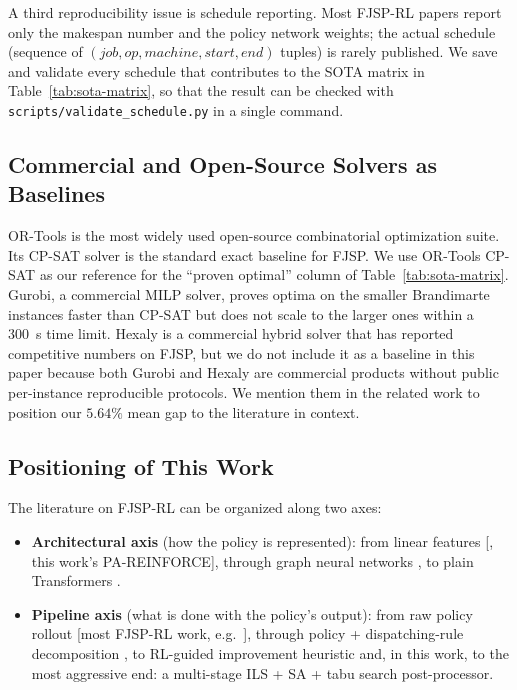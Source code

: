 \documentclass[10pt]{article}
\theoremstyle{definition}
\newcommand{\eg}{e.g.\!}
\begin{document}
A third reproducibility issue is schedule reporting. Most FJSP-RL
papers report only the makespan number and the policy network
weights; the actual schedule (sequence of
$(job, op, machine, start, end)$ tuples) is rarely published. We
save and validate every schedule that contributes to the SOTA
matrix in Table~\ref{tab:sota-matrix}, so that the result can be
checked with \texttt{scripts/validate\_schedule.py} in a single
command.

\subsection{Commercial and Open-Source Solvers as Baselines}
\label{sec:rw-solvers}

OR-Tools \citep{Perron2022ORtools} is the most widely used
open-source combinatorial optimization suite. Its CP-SAT
solver is the standard exact baseline for FJSP. We use
OR-Tools CP-SAT as our reference for the ``proven optimal''
column of Table~\ref{tab:sota-matrix}. Gurobi, a
commercial MILP solver, proves optima on the smaller
Brandimarte instances faster than CP-SAT but does not
scale to the larger ones within a 300~s time limit.
Hexaly is a commercial hybrid solver that has
reported competitive numbers on FJSP, but we do not
include it as a baseline in this paper because both
Gurobi and Hexaly are commercial products without
public per-instance reproducible protocols. We mention
them in the related work to position our $5.64\%$ mean
gap to the literature in context.

\subsection{Positioning of This Work}
\label{sec:rw-positioning}

The literature on FJSP-RL can be organized along two axes:

\begin{itemize}
\item \textbf{Architectural axis} (how the policy is
      represented): from linear features
      [\citet{Williams1992}, this work's PA-REINFORCE],
      through graph neural networks
      \citep{Lei2022, Yang2024, Hamilton2017GraphSAGE}, to
      plain Transformers \citep{Kool2019, Vaswani2017}.
\item \textbf{Pipeline axis} (what is done with the
      policy's output): from raw policy rollout
      [most FJSP-RL work, \eg\ \citet{Lei2022, Yang2024}],
      through policy + dispatching-rule decomposition
      \citep{Song2022TII}, to RL-guided improvement
      heuristic \citep{Zhang2024L2I, Hottung2022} and, in
      this work, to the most aggressive end: a
      multi-stage ILS + SA + tabu search post-processor.
\end{itemize}
\end{document}
